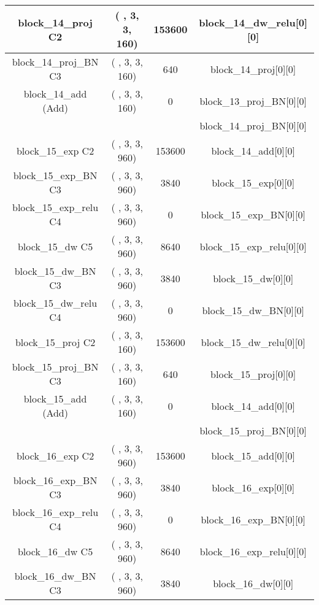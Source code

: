 \documentclass{bmvc2k}
\begin{document}
\begin{table}
\begin{tabular}{|c|c|c|c|}
block\_14\_proj C2       & ( , 3, 3, 160)  &  153600 &     block\_14\_dw\_relu[0][0]    \\ \hline
block\_14\_proj\_BN C3 & ( , 3, 3, 160)  &  640    &     block\_14\_proj[0][0]           \\ \hline
block\_14\_add (Add)              & ( , 3, 3, 160)  &  0      &     block\_13\_proj\_BN[0][0]        \\ 
                                  &                    &         &      block\_14\_proj\_BN[0][0]       \\ \hline
block\_15\_exp C2        & ( , 3, 3, 960)  &  153600 &     block\_14\_add[0][0]               \\ \hline
block\_15\_exp\_BN C3 & ( , 3, 3, 960)  &  3840   &     block\_15\_exp[0][0]            \\ \hline
block\_15\_exp\_relu C4     & ( , 3, 3, 960)  &  0      &     block\_15\_exp\_BN[0][0]         \\ \hline
block\_15\_dw C5 & ( , 3, 3, 960)  &  8640   &     block\_15\_exp\_relu[0][0]       \\ \hline
block\_15\_dw\_BN C3 & ( , 3, 3, 960)  &  3840   &     block\_15\_dw[0][0]         \\ \hline
block\_15\_dw\_relu C4  & ( , 3, 3, 960)  &  0      &     block\_15\_dw\_BN[0][0]      \\ \hline
block\_15\_proj C2       & ( , 3, 3, 160)  &  153600 &     block\_15\_dw\_relu[0][0]    \\ \hline
block\_15\_proj\_BN C3 & ( , 3, 3, 160)  &  640    &     block\_15\_proj[0][0]           \\ \hline
block\_15\_add (Add)              & ( , 3, 3, 160)  &  0      &     block\_14\_add[0][0]               \\ 
                                &                    &         &      block\_15\_proj\_BN[0][0]        \\ \hline
block\_16\_exp C2        & ( , 3, 3, 960)  &  153600 &     block\_15\_add[0][0]               \\ \hline
block\_16\_exp\_BN C3 & ( , 3, 3, 960)  &  3840   &     block\_16\_exp[0][0]            \\ \hline
block\_16\_exp\_relu C4     & ( , 3, 3, 960)  &  0      &     block\_16\_exp\_BN[0][0]         \\ \hline
block\_16\_dw C5 & ( , 3, 3, 960)  &  8640   &     block\_16\_exp\_relu[0][0]       \\ \hline
block\_16\_dw\_BN C3 & ( , 3, 3, 960)  &  3840   &     block\_16\_dw[0][0]         \\ \hline

\end{tabular}
\end{table}
\end{document}
